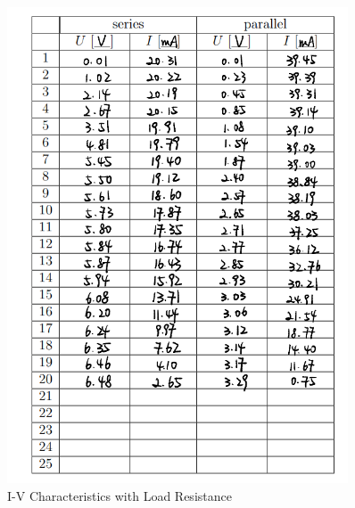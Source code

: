 \documentclass[12pt, a4paper, oneside]{article}
\begin{document}
\begin{figure}[htbp]
	\centering
	\includegraphics[width=0.9\textwidth]{D4.png}
	\caption{I-V Characteristics with Load Resistance}
	\label{fig2}
\end{figure}
\end{document}
